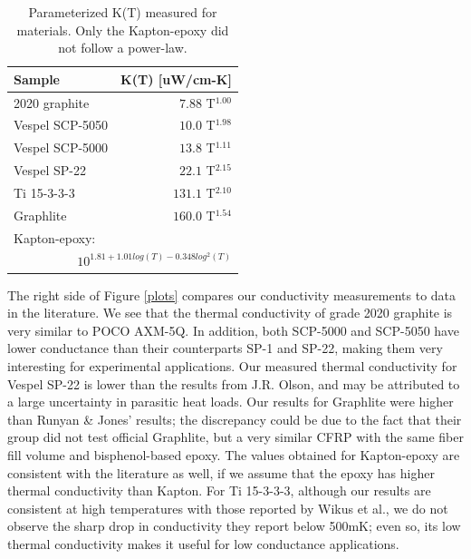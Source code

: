 \documentclass[final]{svjour2}
\begin{document}
\begin{table}
\centering
\small
\begin{threeparttable}
\begin{tabular}{lr}
\toprule
Sample & K(T) [uW/cm-K] \\
\midrule
2020 graphite & $7.88$ T$^{1.00}$ \\
Vespel SCP-5050 & $10.0$ T$^{1.98}$ \\
Vespel SCP-5000 & $13.8$ T$^{1.11}$ \\
Vespel SP-22 & $22.1$ T$^{2.15}$ \\
Ti 15-3-3-3 & $131.1$ T$^{2.10}$ \\
Graphlite & $160.0$ T$^{1.54}$ \\
Kapton-epoxy: & \\
\multicolumn{2}{r}{$10^{1.81 + 1.01log(T) - 0.348log^2(T)}$} \\
\bottomrule
\end{tabular}
\caption{{\small Parameterized K(T) measured for materials. Only the Kapton-epoxy did not follow a power-law.}}
\label{cond_table}
\end{threeparttable}
\end{table}

The right side of Figure \ref{plots} compares our conductivity measurements to data in the literature. We see that the thermal conductivity of grade 2020 graphite is very similar to POCO AXM-5Q. In addition, both SCP-5000 and SCP-5050 have lower conductance than their counterparts SP-1 and SP-22, making them very interesting for experimental applications. Our measured thermal conductivity for Vespel SP-22 is lower than the results from J.R. Olson\cite{Olson1993}, and may be attributed to a large uncertainty in parasitic heat loads. Our results for Graphlite were higher than Runyan \& Jones' results\cite{Runyan2008}; the discrepancy could be due to the fact that their group did not test official Graphlite, but a very similar CFRP with the same fiber fill volume and bisphenol-based epoxy.  The values obtained for Kapton-epoxy are consistent with the literature as well, if we assume that the epoxy has higher thermal conductivity than Kapton. For Ti 15-3-3-3, although our results are consistent at high temperatures with those reported by Wikus et al.\cite{Wikus2010}, we do not observe the sharp drop in conductivity they report below 500mK; even so, its low thermal conductivity makes it useful for low conductance applications.
\end{document}
